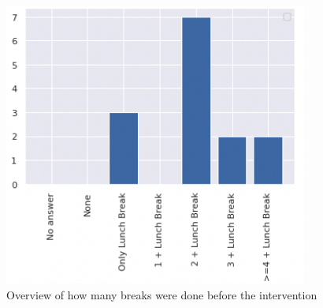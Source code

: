 \documentclass{hasel_thesis}
\begin{document}
\begin{figure}[htp]
    \centering
    \includegraphics[width=10cm]{hasel_thesis/images/number_breaks_prestudy.png}
    \caption{Overview of how many breaks were done before the intervention}
    \label{fig:number_breaks_prestudy}
\end{figure}
\end{document}
